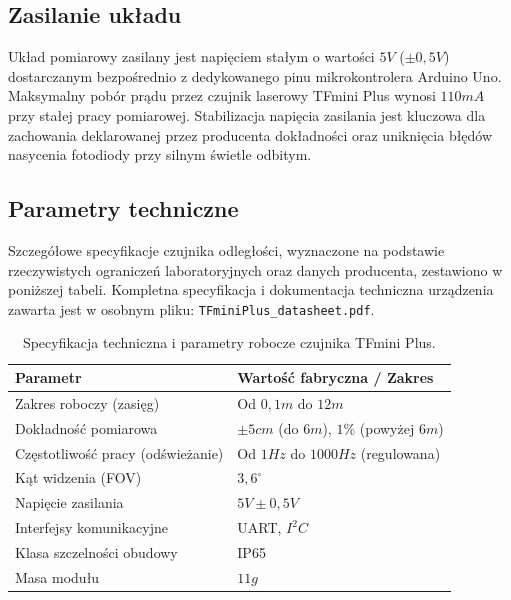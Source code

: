 \documentclass[a4paper,12pt]{article}
\begin{document}
\subsection*{Zasilanie układu}

Układ pomiarowy zasilany jest napięciem stałym o wartości $5{V}$ ($\pm 0{,}5{V}$) dostarczanym bezpośrednio z dedykowanego pinu mikrokontrolera Arduino Uno. Maksymalny pobór prądu przez czujnik laserowy TFmini Plus wynosi $110{mA}$ przy stałej pracy pomiarowej. Stabilizacja napięcia zasilania jest kluczowa dla zachowania deklarowanej przez producenta dokładności oraz uniknięcia błędów nasycenia fotodiody przy silnym świetle odbitym.

\subsection*{Parametry techniczne}

Szczegółowe specyfikacje czujnika odległości, wyznaczone na podstawie rzeczywistych ograniczeń laboratoryjnych oraz danych producenta, zestawiono w poniższej tabeli. Kompletna specyfikacja i dokumentacja techniczna urządzenia zawarta jest w osobnym pliku: \texttt{TFminiPlus\_datasheet.pdf}.

\begin{table}[H]
    \centering
    \label{tab:parametry_tfmini}
    \begin{tabularx}{\textwidth}{@{} X l @{}}
        \toprule
        \textbf{Parametr} & \textbf{Wartość fabryczna / Zakres} \\
        \midrule
        Zakres roboczy (zasięg)           & Od $0{,}1{m}$ do $12{m}$ \\
        Dokładność pomiarowa              & $\pm 5{cm}$ (do $6{m}$), $1\%$ (powyżej $6{m}$) \\
        Częstotliwość pracy (odświeżanie) & Od $1{Hz}$ do $1000{Hz}$ (regulowana) \\
        Kąt widzenia (FOV)                 & $3{,}6^\circ$ \\
        Napięcie zasilania                & $5{V} \pm 0{,}5{V}$ \\
        Interfejsy komunikacyjne          & UART, ${I}^2{C}$ \\
        Klasa szczelności obudowy         & IP65 \\
        Masa modułu                       & $11{g}$ \\
        \bottomrule
    \end{tabularx}
    \caption{Specyfikacja techniczna i parametry robocze czujnika TFmini Plus.}
\end{table}
\end{document}
